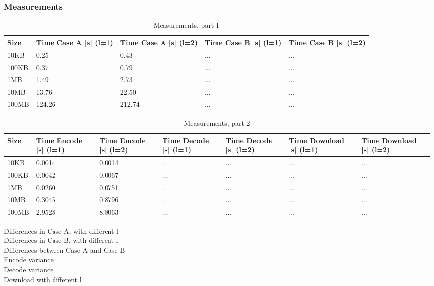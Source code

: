 \subsubsection*{Measurements}
\begin{table}[H]
    \begin{tabularx}{\textwidth}{|X|X|X|X|X|}
        \hline
        \cellcolor{lightgray}\textbf{Size} & \cellcolor{lightgray}\textbf{Time Case A [s] (l=1)} & \cellcolor{lightgray}\textbf{Time Case A [s] (l=2)} & \cellcolor{lightgray}\textbf{Time Case B [s] (l=1)} & \cellcolor{lightgray}\textbf{Time Case B [s] (l=2)} \\\hline
        10KB  & 0.25   & 0.43   & ... & ... \\\hline
        100KB & 0.37   & 0.79   & ... & ... \\\hline
        1MB   & 1.49   & 2.73   & ... & ... \\\hline
        10MB  & 13.76  & 22.50  & ... & ... \\\hline
        100MB & 124.26 & 212.74 & ... & ... \\\hline
    \end{tabularx}
    \caption{Measurements, part 1}
	\label{tab:e3meas1}
\end{table}

\begin{table}[H]
    \begin{tabularx}{\textwidth}{|X|X|X|X|X|X|X|}
        \hline
        \cellcolor{lightgray}\textbf{Size} & \cellcolor{lightgray}\textbf{Time Encode [s] (l=1)} & \cellcolor{lightgray}\textbf{Time Encode [s] (l=2)} & \cellcolor{lightgray}\textbf{Time Decode [s] (l=1)} & \cellcolor{lightgray}\textbf{Time Decode [s] (l=2)} & \cellcolor{lightgray}\textbf{Time Download [s] (l=1)} & \cellcolor{lightgray}\textbf{Time Download [s] (l=2)} \\\hline
        10KB  & 0.0014 & 0.0014 & ... & ... & ... & ... \\\hline
        100KB & 0.0042 & 0.0067 & ... & ... & ... & ... \\\hline
        1MB   & 0.0260 & 0.0751 & ... & ... & ... & ... \\\hline
        10MB  & 0.3045 & 0.8796 & ... & ... & ... & ... \\\hline
        100MB & 2.9528 & 8.8063 & ... & ... & ... & ... \\\hline
    \end{tabularx}
    \caption{Measurements, part 2}
	\label{tab:e3meas2}
\end{table}

Differences in Case A, with different l \\
Differences in Case B, with different l \\
Differences between Case A and Case B \\
Encode variance \\
Decode variance \\
Download with different l
